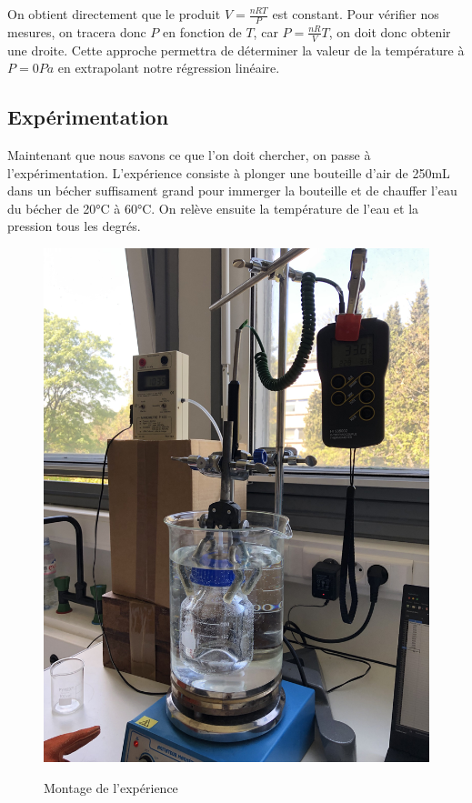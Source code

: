 \documentclass[12pt]{article}
\begin{document}
On obtient directement que le produit $V = \frac{nRT}{P}$ est constant. Pour vérifier nos mesures, on tracera donc $P$ en fonction de $T$, 
car $P = \frac{nR}{V} T$, on doit donc obtenir une droite. Cette approche permettra de déterminer la valeur de la température à $P=0Pa$ en extrapolant notre régression linéaire.

\subsection{Expérimentation}
Maintenant que nous savons ce que l'on doit chercher, on passe à l'expérimentation. L'expérience consiste à
plonger une bouteille d'air de 250mL dans un bécher suffisament grand pour immerger la bouteille et de chauffer l'eau du bécher de 20°C à 60°C.
On relève ensuite la température de l'eau et la pression tous les degrés.

\begin{figure}[!h]
	\begin{center}
		\includegraphics[scale=0.07]{img/exp2.jpg}
		\label{Exp2}
		\caption{Montage de l'expérience}
	\end{center}
\end{figure}
\end{document}
